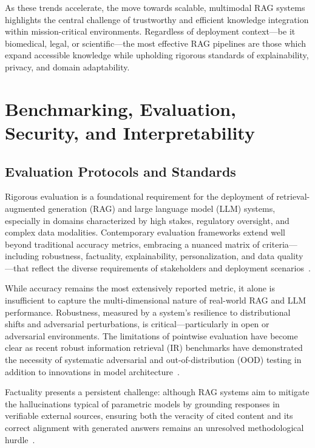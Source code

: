 \documentclass[sigconf]{acmart}
\begin{document}
As these trends accelerate, the move towards scalable, multimodal RAG systems highlights the central challenge of trustworthy and efficient knowledge integration within mission-critical environments. Regardless of deployment context—be it biomedical, legal, or scientific—the most effective RAG pipelines are those which expand accessible knowledge while upholding rigorous standards of explainability, privacy, and domain adaptability.

\section{Benchmarking, Evaluation, Security, and Interpretability}

\subsection{Evaluation Protocols and Standards}

Rigorous evaluation is a foundational requirement for the deployment of retrieval-augmented generation (RAG) and large language model (LLM) systems, especially in domains characterized by high stakes, regulatory oversight, and complex data modalities. Contemporary evaluation frameworks extend well beyond traditional accuracy metrics, embracing a nuanced matrix of criteria—including robustness, factuality, explainability, personalization, and data quality—that reflect the diverse requirements of stakeholders and deployment scenarios~\cite{ref2,ref3,ref5,ref8,ref10,ref21,ref22,ref25,ref26,ref28,ref29,ref30,ref32,ref33,ref34,ref36,ref37,ref38,ref39,ref40,ref42,ref43,ref46,ref47,ref49,ref50,ref51,ref52,ref53,ref54,ref55,ref61,ref62}.

While accuracy remains the most extensively reported metric, it alone is insufficient to capture the multi-dimensional nature of real-world RAG and LLM performance. Robustness, measured by a system’s resilience to distributional shifts and adversarial perturbations, is critical—particularly in open or adversarial environments. The limitations of pointwise evaluation have become clear as recent robust information retrieval (IR) benchmarks have demonstrated the necessity of systematic adversarial and out-of-distribution (OOD) testing in addition to innovations in model architecture~\cite{ref49,ref50,ref54,ref61}. 

Factuality presents a persistent challenge: although RAG systems aim to mitigate the hallucinations typical of parametric models by grounding responses in verifiable external sources, ensuring both the veracity of cited content and its correct alignment with generated answers remains an unresolved methodological hurdle~\cite{ref32,ref33,ref34,ref36,ref37,ref49,ref51,ref52,ref53,ref54,ref55,ref61,ref62,ref63,ref64}. 
\end{document}
